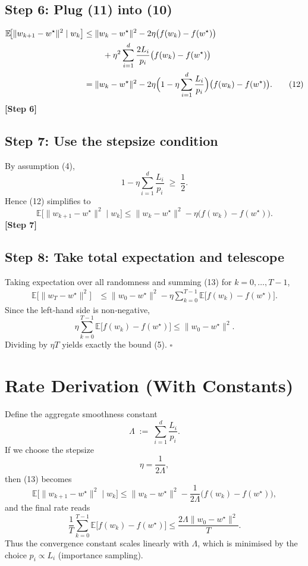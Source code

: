 \documentclass{article}
\newcommand{\E}{\mathbb{E}}
\begin{document}
\subsection*{Step 6: Plug (11) into (10)}
\[
\begin{aligned}
\E\!\bigl[\|w_{k+1}-w^{\star}\|^{2}\mid w_k\bigr]
&\le\|w_{k}-w^{\star}\|^{2}
   -2\eta\bigl(f(w_k)-f(w^{\star})\bigr)  \\
&\qquad\; +\eta^{2}\sum_{i=1}^{d}\frac{2L_i}{p_i}
          \bigl(f(w_k)-f(w^{\star})\bigr)\\
&=\|w_{k}-w^{\star}\|^{2}
   -2\eta\Bigl(1-\eta\sum_{i=1}^{d}\frac{L_i}{p_i}\Bigr)
      \bigl(f(w_k)-f(w^{\star})\bigr).
\tag{12}
\end{aligned}
\]
\textbf{[Step 6]}

\subsection*{Step 7: Use the stepsize condition}
By assumption (4),
\[
1-\eta\sum_{i=1}^{d}\frac{L_i}{p_i}\;\ge\;\frac12 .
\]
Hence (12) simplifies to
\[
\E\!\bigl[\|w_{k+1}-w^{\star}\|^{2}\mid w_k\bigr]
\le\|w_{k}-w^{\star}\|^{2}
   -\eta\bigl(f(w_k)-f(w^{\star})\bigr).
\tag{13}
\]
\textbf{[Step 7]}

\subsection*{Step 8: Take total expectation and telescope}
Taking expectation over all randomness and summing (13) for $k=0,\dots ,T-1$,
\[
\begin{aligned}
\E\!\bigl[\|w_{T}-w^{\star}\|^{2}\bigr]
&\le \|w_{0}-w^{\star}\|^{2}
   -\eta\sum_{k=0}^{T-1}\E\!\bigl[f(w_k)-f(w^{\star})\bigr].
\end{aligned}
\tag{14}
\]
Since the left‑hand side is non‑negative,
\[
\eta\sum_{k=0}^{T-1}\E\!\bigl[f(w_k)-f(w^{\star})\bigr]
\le\|w_{0}-w^{\star}\|^{2}.
\tag{15}
\]
Dividing by $\eta T$ yields exactly the bound (5). \hfill $\square$

\section*{Rate Derivation (With Constants)}
Define the aggregate smoothness constant
\[
\Lambda\;:=\;\sum_{i=1}^{d}\frac{L_i}{p_i}.
\]
If we choose the stepsize
\[
\eta = \frac{1}{2\Lambda},
\]
then (13) becomes
\[
\E\!\bigl[\|w_{k+1}-w^{\star}\|^{2}\mid w_k\bigr]
\le\|w_{k}-w^{\star}\|^{2}
   -\frac{1}{2\Lambda}\bigl(f(w_k)-f(w^{\star})\bigr),
\]
and the final rate reads
\[
\frac{1}{T}\sum_{k=0}^{T-1}\E\!\bigl[f(w_k)-f(w^{\star})\bigr]
\le \frac{2\Lambda\|w_{0}-w^{\star}\|^{2}}{T}.
\]
Thus the convergence constant scales linearly with $\Lambda$, which is
minimised by the choice $p_i\propto L_i$ (importance sampling).
\end{document}
